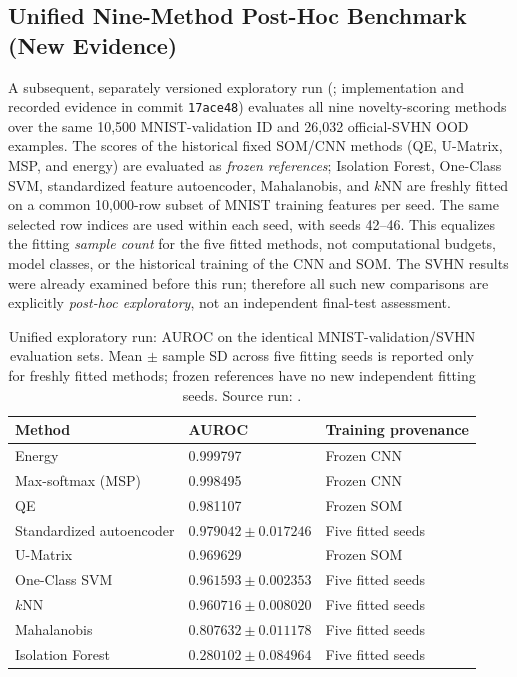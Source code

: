 \documentclass[11pt]{article}
\DeclareRobustCommand{\runcap}[1]{\texttt{\detokenize{#1}}}
\begin{document}
\subsection{Unified Nine-Method Post-Hoc Benchmark (New Evidence)}
A subsequent, separately versioned exploratory run (; implementation and recorded evidence in commit \texttt{17ace48}) evaluates all nine novelty-scoring methods over the same 10,500 MNIST-validation ID and 26,032 official-SVHN OOD examples. The scores of the historical fixed SOM/CNN methods (QE, U-Matrix, MSP, and energy) are evaluated as \emph{frozen references}; Isolation Forest, One-Class SVM, standardized feature autoencoder, Mahalanobis, and $k$NN are freshly fitted on a common 10,000-row subset of MNIST training features per seed. The same selected row indices are used within each seed, with seeds 42--46. This equalizes the fitting \emph{sample count} for the five fitted methods, not computational budgets, model classes, or the historical training of the CNN and SOM. The SVHN results were already examined before this run; therefore all such new comparisons are explicitly \emph{post-hoc exploratory}, not an independent final-test assessment.

\begin{table}[htbp]
\centering\small
\caption{Unified exploratory run: AUROC on the identical MNIST-validation/SVHN evaluation sets. Mean $\pm$ sample SD across five fitting seeds is reported only for freshly fitted methods; frozen references have no new independent fitting seeds. Source run: \runcap{mnist_svhn_unified_nine_methods_s42_46_v1}.}
\label{tab:unified}
\begin{tabular}{@{}lll@{}}\toprule
Method & AUROC & Training provenance \\\midrule
Energy & 0.999797 & Frozen CNN \\
Max-softmax (MSP) & 0.998495 & Frozen CNN \\
QE & 0.981107 & Frozen SOM \\
Standardized autoencoder & $0.979042 \pm 0.017246$ & Five fitted seeds \\
U-Matrix & 0.969629 & Frozen SOM \\
One-Class SVM & $0.961593 \pm 0.002353$ & Five fitted seeds \\
$k$NN & $0.960716 \pm 0.008020$ & Five fitted seeds \\
Mahalanobis & $0.807632 \pm 0.011178$ & Five fitted seeds \\
Isolation Forest & $0.280102 \pm 0.084964$ & Five fitted seeds \\\bottomrule
\end{tabular}
\end{table}
\end{document}
